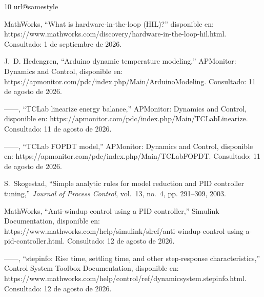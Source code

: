 \documentclass[conference,a4paper,10pt]{IEEEtran}
\begin{document}
\begin{thebibliography}{10}
\providecommand{\url}[1]{#1}
\csname url@samestyle\endcsname
\providecommand{\newblock}{\relax}
\providecommand{\bibinfo}[2]{#2}
\providecommand{\BIBentrySTDinterwordspacing}{\spaceskip=0pt\relax}
\providecommand{\BIBentryALTinterwordstretchfactor}{4}
\providecommand{\BIBentryALTinterwordspacing}{\spaceskip=\fontdimen2\font plus
\BIBentryALTinterwordstretchfactor\fontdimen3\font minus
  \fontdimen4\font\relax}
\providecommand{\BIBforeignlanguage}[2]{{%
\expandafter\ifx\csname l@#1\endcsname\relax
\typeout{** WARNING: IEEEtran.bst: No hyphenation pattern has been}%
\typeout{** loaded for the language `#1'. Using the pattern for}%
\typeout{** the default language instead.}%
\else
\language=\csname l@#1\endcsname
\fi
#2}}
\providecommand{\BIBdecl}{\relax}
\BIBdecl

{MathWorks}, ``What is hardware-in-the-loop ({HIL})?'' disponible en:
  \url{https://www.mathworks.com/discovery/hardware-in-the-loop-hil.html}.
  Consultado: 1 de septiembre de 2026.

J.~D. Hedengren, ``Arduino dynamic temperature modeling,'' APMonitor: Dynamics
  and Control, disponible en:
  \url{https://apmonitor.com/pdc/index.php/Main/ArduinoModeling}. Consultado:
  11 de agosto de 2026.

------, ``{TCLab} linearize energy balance,'' APMonitor: Dynamics and Control,
  disponible en: \url{https://apmonitor.com/pdc/index.php/Main/TCLabLinearize}.
  Consultado: 11 de agosto de 2026.

------, ``{TCLab} {FOPDT} model,'' APMonitor: Dynamics and Control, disponible
  en: \url{https://apmonitor.com/pdc/index.php/Main/TCLabFOPDT}. Consultado: 11
  de agosto de 2026.

S.~Skogestad, ``Simple analytic rules for model reduction and {PID} controller
  tuning,'' \emph{Journal of Process Control}, vol.~13, no.~4, pp. 291--309,
  2003.

{MathWorks}, ``Anti-windup control using a {PID} controller,'' Simulink
  Documentation, disponible en:
  \url{https://www.mathworks.com/help/simulink/slref/anti-windup-control-using-a-pid-controller.html}.
  Consultado: 12 de agosto de 2026.

------, ``stepinfo: Rise time, settling time, and other step-response
  characteristics,'' Control System Toolbox Documentation, disponible en:
  \url{https://www.mathworks.com/help/control/ref/dynamicsystem.stepinfo.html}.
  Consultado: 12 de agosto de 2026.


\end{thebibliography}
\end{document}
